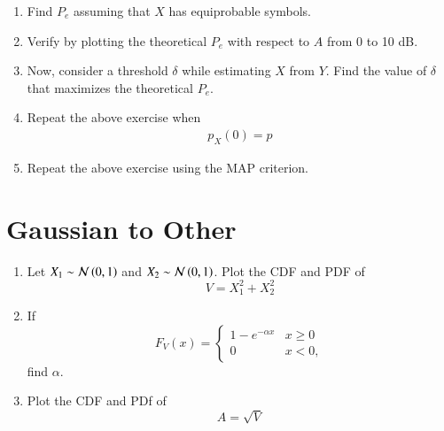\documentclass[journal,12pt,twocolumn]{IEEEtran}
\renewcommand\thesection{\arabic{section}}
\begin{document}
\begin{enumerate}[label=\thesection.\arabic*,ref=\thesection.\theenumi]
\begin{enumerate}[label=\thesection.\arabic*
,ref=\thesection.\theenumi]
\begin{align}
		  &= 1 - F_{N}\brak{A}\\
		  &= F_{N}\brak{-A}\\
		  &= 0 \label{eq-5.5.2}
  \end{align}
The above calculations are coded in below python file,
  \begin{lstlisting}
    wget  https://github.com/Charanyash/Random-Numbers-/tree/main/codes/Q5/5.5.py
  \end{lstlisting}
  Run the following command
  \begin{lstlisting}
   python3 5.5.py
  \end{lstlisting}
\item Find $P_e$ assuming that $X$ has equiprobable symbols.
%
\item
Verify by plotting  the theoretical $P_e$ with respect to $A$ from 0 to 10 dB.
%
\item Now, consider a threshold $\delta$  while estimating $X$ from $Y$. Find the value of $\delta$ that maximizes the theoretical $P_e$.
\item Repeat the above exercise when
	\begin{align}
		p_{X}(0) = p
	\end{align}
\item Repeat the above exercise using the MAP criterion.
		\end{enumerate}
\section{Gaussian to Other}
\begin{enumerate}[label=\thesection.\arabic*
,ref=\thesection.\theenumi]
\item
Let $X_1 \sim  \mathcal{N}\left(0,1\right)$ and $X_2 \sim  \mathcal{N}\left(0,1\right)$. Plot the CDF and PDF of
%
\begin{equation}
V = X_1^2 + X_2^2
\end{equation}
%
%
%
\item
If
%
\begin{equation}
F_{V}(x) =
\begin{cases}
1 - e^{-\alpha x} & x \geq 0 \\
0 & x < 0,
\end{cases}
\end{equation}
%
find $\alpha$.
%
\item
\label{ch3_raleigh_sim}
Plot the CDF and PDf of
%
\begin{equation}
A = \sqrt{V}
\end{equation}
%
\end{enumerate}

\end{enumerate}
\end{document}
